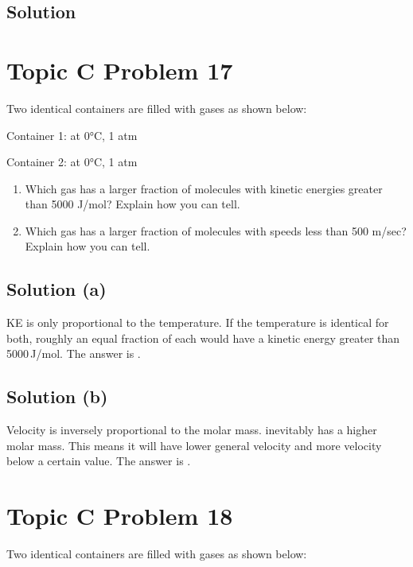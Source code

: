\documentclass[10pt]{article}
\begin{document}
        \subsection{Solution}

    \pagebreak
    \section{Topic C Problem 17}
        Two identical containers are filled with gases as shown below: 
        
        Container 1:  at 0\unit{\celsius}, 1 atm 
        
        Container 2:  at 0\unit{\celsius}, 1 atm

        \begin{enumerate} [label=\alph*)]
            \item Which gas has a larger fraction of molecules with kinetic energies greater than 5000 J/mol? Explain how you can tell.
            \item Which gas has a larger fraction of molecules with speeds less than 500 m/sec? Explain how you can tell.
        \end{enumerate}

        \subsection{Solution (a)}
            KE is only proportional to the temperature.
            If the temperature is identical for both, roughly an equal fraction of each would have a kinetic energy greater than 5000\,\unit{\joule/\mole}. 
            The answer is . 

        \subsection{Solution (b)}
            Velocity is inversely proportional to the molar mass.
             inevitably has a higher molar mass.
            This means it will have lower general velocity and more velocity below a certain value.
            The answer is . 

    \pagebreak
    \section{Topic C Problem 18}
        Two identical containers are filled with gases as shown below:
\end{document}
